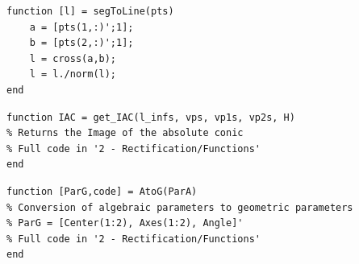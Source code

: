 \documentclass[12pt,a4paper]{article}
\begin{document}
\begin{verbatim}
function [l] = segToLine(pts)
    a = [pts(1,:)';1];
    b = [pts(2,:)';1];
    l = cross(a,b);
    l = l./norm(l);
end
\end{verbatim}

\begin{verbatim}
function IAC = get_IAC(l_infs, vps, vp1s, vp2s, H)
% Returns the Image of the absolute conic
% Full code in '2 - Rectification/Functions'
end
\end{verbatim}

\begin{verbatim}
function [ParG,code] = AtoG(ParA)
% Conversion of algebraic parameters to geometric parameters
% ParG = [Center(1:2), Axes(1:2), Angle]'
% Full code in '2 - Rectification/Functions'
end
\end{verbatim}

\pagebreak


\end{document}
